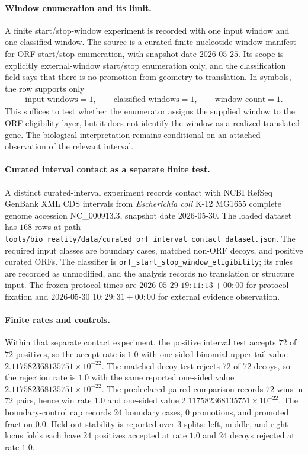 \paragraph{Window enumeration and its limit.}
A finite start/stop-window experiment is recorded with one input window and one classified window.  The source is a curated finite nucleotide-window manifest for ORF start/stop enumeration, with snapshot date $2026$-$05$-$25$.  Its scope is explicitly external-window start/stop enumeration only, and the classification field says that there is no promotion from geometry to translation.  In symbols, the row supports only
$$
\begin{aligned}
\text{input windows}=1,\qquad \text{classified windows}=1,\qquad \text{window count}=1.
\end{aligned}
$$
This suffices to test whether the enumerator assigns the supplied window to the ORF-eligibility layer, but it does not identify the window as a realized translated gene.  The biological interpretation remains conditional on an attached observation of the relevant interval.

\paragraph{Curated interval contact as a separate finite test.}
A distinct curated-interval experiment records contact with NCBI RefSeq GenBank XML CDS intervals from \emph{Escherichia coli} K-12 MG1655 complete genome accession NC\_000913.3, snapshot date $2026$-$05$-$30$.  The loaded dataset has $168$ rows at path \texttt{tools/bio\_reality/data/curated\_orf\_interval\_contact\_dataset.json}.  The required input classes are boundary cases, matched non-ORF decoys, and positive curated ORFs.  The classifier is \texttt{orf\_start\_stop\_window\_eligibility}; its rules are recorded as unmodified, and the analysis records no translation or structure input.  The frozen protocol times are $2026$-$05$-$29$ $19{:}11{:}13+00{:}00$ for protocol fixation and $2026$-$05$-$30$ $10{:}29{:}31+00{:}00$ for external evidence observation.

\paragraph{Finite rates and controls.}
Within that separate contact experiment, the positive interval test accepts $72$ of $72$ positives, so the accept rate is $1.0$ with one-sided binomial upper-tail value $2.117582368135751\times 10^{-22}$.  The matched decoy test rejects $72$ of $72$ decoys, so the rejection rate is $1.0$ with the same reported one-sided value $2.117582368135751\times 10^{-22}$.  The predeclared paired comparison records $72$ wins in $72$ pairs, hence win rate $1.0$ and one-sided value $2.117582368135751\times 10^{-22}$.  The boundary-control cap records $24$ boundary cases, $0$ promotions, and promoted fraction $0.0$.  Held-out stability is reported over $3$ splits: left, middle, and right locus folds each have $24$ positives accepted at rate $1.0$ and $24$ decoys rejected at rate $1.0$.

